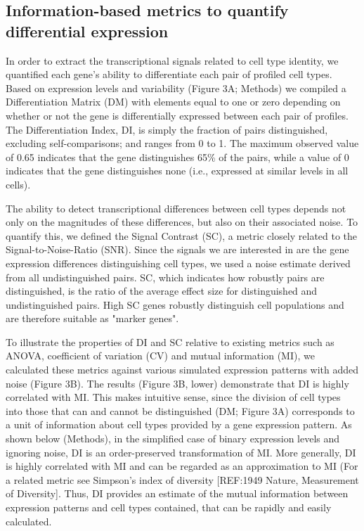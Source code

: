 \subsection{Information-based metrics to quantify differential expression}
In order to extract the transcriptional signals related to cell type identity, we quantified each gene's ability to differentiate each pair of profiled cell types. Based on expression levels and variability (Figure 3A; Methods) we compiled a Differentiation Matrix (DM) with elements equal to one or zero depending on whether or not the gene is differentially expressed between each pair of profiles. The Differentiation Index, DI, is simply the fraction of pairs distinguished, excluding self-comparisons; and ranges from 0 to 1. The maximum observed value of 0.65 indicates that the gene distinguishes 65\% of the pairs, while a value of 0 indicates that the gene distinguishes none (i.e., expressed at similar levels in all cells). 

The ability to detect transcriptional differences between cell types depends not only on the magnitudes of these differences, but also on their associated noise. To quantify this, we defined the Signal Contrast (SC), a metric closely related to the Signal-to-Noise-Ratio (SNR). Since the signals we are interested in are the gene expression differences distinguishing cell types, we used a noise estimate derived from all undistinguished pairs. SC, which indicates how robustly pairs are distinguished, is the ratio of the average effect size for distinguished and undistinguished pairs. High SC genes robustly distinguish cell populations and are therefore suitable as "marker genes".

To illustrate the properties of DI and SC relative to existing metrics such as ANOVA, coefficient of variation (CV) and mutual information (MI), we calculated these metrics against various simulated expression patterns with added noise (Figure 3B). The results (Figure 3B, lower) demonstrate that DI is highly correlated with MI. This makes intuitive sense, since the division of cell types into those that can and cannot be distinguished (DM; Figure 3A) corresponds to a unit of information about cell types provided by a gene expression pattern. As shown below (Methods), in the simplified case of binary expression levels and ignoring noise, DI is an order-preserved transformation of MI. More generally, DI is highly correlated with MI and can be regarded as an approximation to MI (For a related metric see Simpson's index of diversity [REF:1949 Nature, Measurement of Diversity]. Thus, DI provides an estimate of the mutual information between expression patterns and cell types contained, that can be rapidly and easily calculated. 

